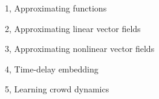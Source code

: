 \documentclass[10pt,a4paper]{article}
\begin{document}
\frontpage

\begin{task}{1, Approximating functions}

\end{task}

\begin{task}{2, Approximating linear vector fields}

\end{task}

\begin{task}{3, Approximating nonlinear vector fields}

\end{task}

\begin{task}{4, Time-delay embedding}

\end{task}

\begin{task}{5, Learning crowd dynamics}

\end{task}



\end{document}

